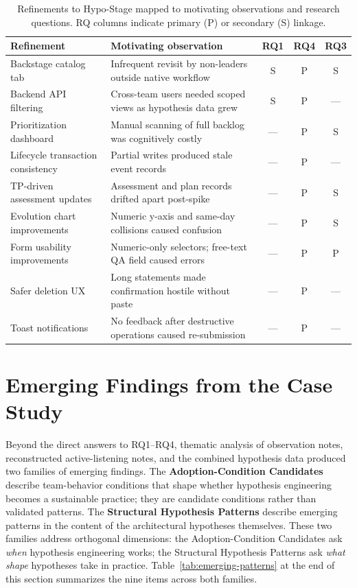 \begin{table}[htbp]
\caption{Refinements to Hypo-Stage mapped to motivating observations and
  research questions. RQ columns indicate primary (P) or secondary (S) linkage.}
\label{tab:refinements-map}
\centering\small
\setlength{\tabcolsep}{4pt}
\begin{tabular}{p{3.8cm}p{4.5cm}ccc}
\toprule
\textbf{Refinement} & \textbf{Motivating observation} &
\textbf{RQ1} & \textbf{RQ4} & \textbf{RQ3} \\
\midrule
Backstage catalog tab
  & Infrequent revisit by non-leaders outside native workflow
  & S & P & S \\
Backend API filtering
  & Cross-team users needed scoped views as hypothesis data grew
  & S & P & — \\
Prioritization dashboard
  & Manual scanning of full backlog was cognitively costly
  & — & P & S \\
Lifecycle transaction consistency
  & Partial writes produced stale event records
  & — & P & — \\
TP-driven assessment updates
  & Assessment and plan records drifted apart post-spike
  & — & P & S \\
Evolution chart improvements
  & Numeric y-axis and same-day collisions caused confusion
  & — & P & S \\
Form usability improvements
  & Numeric-only selectors; free-text QA field caused errors
  & — & P & P \\
Safer deletion UX
  & Long statements made confirmation hostile without paste
  & — & P & — \\
Toast notifications
  & No feedback after destructive operations caused re-submission
  & — & P & — \\
\bottomrule
\end{tabular}
\end{table}

\section{Emerging Findings from the Case Study}
\label{sec:emerging-patterns}

Beyond the direct answers to RQ1–RQ4, thematic analysis of observation notes,
reconstructed active-listening notes, and the combined hypothesis data produced two
families of emerging findings. The \textbf{Adoption-Condition Candidates}
describe team-behavior conditions that shape whether hypothesis engineering
becomes a sustainable practice; they are candidate conditions rather than
validated patterns. The \textbf{Structural Hypothesis Patterns} describe
emerging patterns in the content of the architectural hypotheses
themselves. These two families address orthogonal dimensions: the
Adoption-Condition Candidates ask \textit{when} hypothesis engineering works;
the Structural Hypothesis Patterns ask \textit{what shape} hypotheses take in
practice. Table~\ref{tab:emerging-patterns} at the end of this section
summarizes the nine items across both families.

